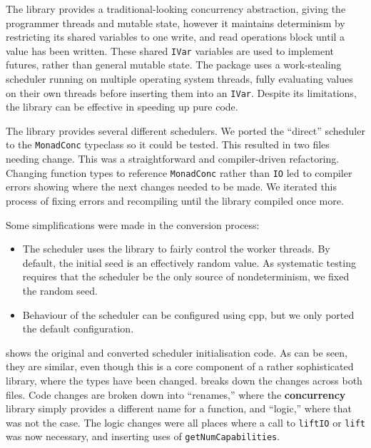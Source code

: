 The  library\cite{marlow2011} provides a
traditional-looking concurrency abstraction, giving the programmer
threads and mutable state, however it maintains determinism by
restricting its shared variables to one write, and read operations
block until a value has been written.  These shared \verb|IVar|
variables are used to implement futures, rather than general mutable
state.  The package uses a work-stealing scheduler running on multiple
operating system threads, fully evaluating values on their own threads
before inserting them into an \verb|IVar|.  Despite its limitations,
the library can be effective in speeding up pure code.

The library provides several different schedulers.  We ported the
``direct'' scheduler to the \verb|MonadConc| typeclass so it could be
tested.  This resulted in two files needing change.  This was a
straightforward and compiler-driven refactoring.  Changing function
types to reference \verb|MonadConc| rather than \verb|IO| led to
compiler errors showing where the next changes needed to be made.  We
iterated this process of fixing errors and recompiling until the
library compiled once more.

Some simplifications were made in the conversion process:

\begin{itemize}
\item The scheduler uses the  library to fairly
  control the worker threads.  By default, the initial seed is an
  effectively random value.  As systematic testing requires that the
  scheduler be the only source of nondeterminism, we fixed the random
  seed.
\item Behaviour of the scheduler can be configured using cpp, but we
  only ported the default configuration.
\end{itemize}

 shows the original and converted
scheduler initialisation code.  As can be seen, they are similar, even
though this is a core component of a rather sophisticated library,
where the types have been changed.  
breaks down the changes across both files.  Code changes are broken
down into ``renames,'' where the \textbf{concurrency} library simply
provides a different name for a function, and ``logic,'' where that
was not the case.  The logic changes were all places where a call to
\verb|liftIO| or \verb|lift| was now necessary, and inserting uses of
\verb|getNumCapabilities|.

